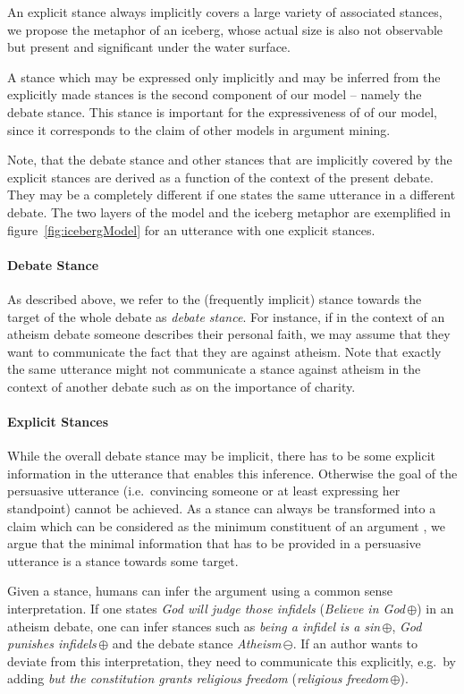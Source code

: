 \documentclass[11pt]{article}
\begin{document}
An explicit stance always implicitly covers a large variety of associated stances, we propose the metaphor of an iceberg, whose actual size is also not observable but present and significant under the water surface. 

A stance which may be expressed only implicitly and may be inferred from the explicitly made stances is the second component of our model -- namely the debate stance.
This stance is important for the expressiveness of of our model, since it corresponds to the claim of other models in argument mining.

Note, that the debate stance and other stances that are implicitly covered by the explicit stances are derived as a function of the context of the present debate. 
They may be a completely different if one states the same utterance in a different debate.
The two layers of the model and the iceberg metaphor are exemplified in figure~\ref{fig:icebergModel} for an utterance with one explicit stances. 

\paragraph{Debate Stance}
As described above, we refer to the (frequently implicit) stance towards the target of the whole debate as \textit{debate stance}.
For instance, if in the context of an atheism debate someone describes their personal faith, we may assume that they want to communicate the fact that they are against atheism.
Note that exactly the same utterance might not communicate a stance against atheism in the context of another debate such as on the importance of charity.

\paragraph{Explicit Stances}
While the overall debate stance may be implicit, there has to be some explicit information in the utterance that enables this inference.
Otherwise the goal of the persuasive utterance (i.e.\ convincing someone or at least expressing her standpoint) cannot be achieved.
As a stance can always be transformed into a claim which can be considered as the minimum constituent of an argument \cite{habernal2014argumentation,palau2009argumentation}, we argue that the minimal information that has to be provided in a persuasive utterance is a stance towards some target.

Given a stance, humans can infer the argument using a common sense interpretation.
If one states \textit{God will judge those infidels} (\textit{Believe in God}\,$\oplus$) in an atheism debate, one can infer stances such as \textit{being a infidel is a sin}\,$\oplus$, \textit{God punishes infidels}\,$\oplus$ and the debate stance \textit{Atheism}\,$\ominus$.
If an author wants to deviate from this interpretation, they need to communicate this explicitly, e.g.\ by adding \textit{but the constitution grants religious freedom} (\textit{religious freedom}\,$\oplus$). 
\end{document}
